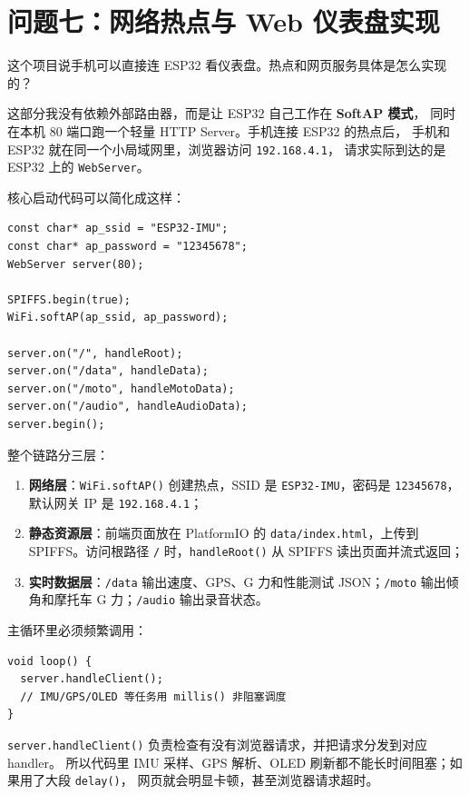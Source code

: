 \documentclass[UTF8,11pt,a4paper]{ctexart}
\begin{document}
\section{问题七：网络热点与 Web 仪表盘实现}

\begin{interviewer}
这个项目说手机可以直接连 ESP32 看仪表盘。热点和网页服务具体是怎么实现的？
\end{interviewer}

\begin{candidate}
这部分我没有依赖外部路由器，而是让 ESP32 自己工作在 \textbf{SoftAP 模式}，
同时在本机 80 端口跑一个轻量 HTTP Server。手机连接 ESP32 的热点后，
手机和 ESP32 就在同一个小局域网里，浏览器访问 \texttt{192.168.4.1}，
请求实际到达的是 ESP32 上的 \texttt{WebServer}。

\medskip
核心启动代码可以简化成这样：
\begin{lstlisting}
const char* ap_ssid = "ESP32-IMU";
const char* ap_password = "12345678";
WebServer server(80);

SPIFFS.begin(true);
WiFi.softAP(ap_ssid, ap_password);

server.on("/", handleRoot);
server.on("/data", handleData);
server.on("/moto", handleMotoData);
server.on("/audio", handleAudioData);
server.begin();
\end{lstlisting}

\medskip
整个链路分三层：
\begin{enumerate}[leftmargin=1.4em,topsep=2pt,itemsep=2pt]
  \item \textbf{网络层}：\texttt{WiFi.softAP()} 创建热点，SSID 是 \texttt{ESP32-IMU}，密码是 \texttt{12345678}，默认网关 IP 是 \texttt{192.168.4.1}；
  \item \textbf{静态资源层}：前端页面放在 PlatformIO 的 \texttt{data/index.html}，上传到 SPIFFS。访问根路径 \texttt{/} 时，\texttt{handleRoot()} 从 SPIFFS 读出页面并流式返回；
  \item \textbf{实时数据层}：\texttt{/data} 输出速度、GPS、G 力和性能测试 JSON；\texttt{/moto} 输出倾角和摩托车 G 力；\texttt{/audio} 输出录音状态。
\end{enumerate}

\medskip
主循环里必须频繁调用：
\begin{lstlisting}
void loop() {
  server.handleClient();
  // IMU/GPS/OLED 等任务用 millis() 非阻塞调度
}
\end{lstlisting}
\texttt{server.handleClient()} 负责检查有没有浏览器请求，并把请求分发到对应 handler。
所以代码里 IMU 采样、GPS 解析、OLED 刷新都不能长时间阻塞；如果用了大段 \texttt{delay()}，
网页就会明显卡顿，甚至浏览器请求超时。
\end{candidate}
\end{document}
